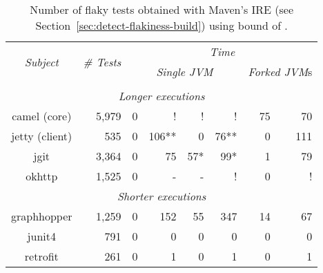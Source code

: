 \begin{table*}[t]
  \centering
  \begin{tabular}{|c|r|r|r|r|r|r|r|}
    \hline
    \multirow{2}{*}{\emph{Subject}} & \multirow{2}{*}{\emph{\# Tests}} &  \multicolumn{6}{c|}{\emph{Time}}\\
    \cline{3-8}
    & & \multicolumn{4}{c|}{\emph{Single JVM}} & \multicolumn{2}{c|}{\emph{Forked JVM}s} \\
    \cline{3-8}
    & & \multicolumn{1}{c|}{\Seq{}} &
    \multicolumn{1}{c|}{\ParClassSeqMeth{}} &
    \multicolumn{1}{c|}{\SeqClassParMeth{}} &
    \multicolumn{1}{c|}{\ParClassParMeth{}} &
    \multicolumn{1}{c|}{\Seq{}} &
    \multicolumn{1}{c|}{\ParClassSeqMeth{}} \\
    \hline
    \hline
    \multicolumn{8}{|c|}{\emph{Longer executions}} \\
    \hline
    camel (core) & 5,979 & 0 & ! & ! & ! & 75 & 70 \\
    \hline
    jetty (client) & 535 & 0 & 106** & 0 & 76** & 0 & 111 \\
    \hline
    jgit & 3,364 & 0 & 75 & 57* & 99* & 1 & 79 \\
    \hline
    okhttp & 1,525 & 0 & - & - & ! & 0 & ! \\    
    \hline
    \hline
    \multicolumn{8}{|c|}{\emph{Shorter executions}} \\
    \hline
    graphhopper & 1,259 & 0 & 152 & 55 & 347 & 14 & 67 \\
    \hline    
    junit4 & 791 & 0 & 0 & 0 & 0 & 0 & 0 \\
    \hline
    \hline
    retrofit & 261 & 0 & 1 & 0 & 1 & 0 & 1 \\
    \hline
  \end{tabular}
  \caption{\label{table:failures}Number of flaky tests obtained with
    Maven's IRE (see Section~\ref{sec:detect-flakiness-build}) using
    bound of .}
\end{table*}
